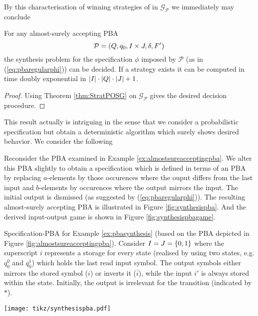 By this characterisation of winning strategies of \eve{} in 
$\mathcal{G}_{\mathcal{P}}$ we immediately may conclude
\begin{theorem}
  For any almost-surely accepting \ac{PBA} 
  \begin{equation*}
    \mathcal{P} = \left(Q, q_{0}, I\times J, \delta, F'\right)
  \end{equation*}
  the synthesis problem for the specification $\phi$ imposed by $\mathcal{P}$
  (as in (\ref{eq:pbaregularphi})) can be decided. If a strategy exists it can 
  be computed in time doubly exponential in 
  $\left\vert{I}\right\vert\cdot \left\vert{Q}\right\vert\cdot \left\vert{J}\right\vert + 1$.
  \label{thm:pbastratpomdpsynthesis}
\end{theorem}
\begin{proof}
  Using Theorem \ref{thm:StratPOSG} on $\mathcal{G}_{\mathcal{P}}$ gives the
  desired decision procedure.
\end{proof}
This result actually is intriguing in the sense that we consider a 
probabilistic specification but obtain a deterministic algorithm which surely 
shows desired behavior. We consider the following
\begin{example}
  Reconsider the \ac{PBA} examined in Example \ref{ex:almostsureacceptingpba}.
  We alter this \ac{PBA} slightly to obtain a specification which is defined in
  terms of an \ac{PBA} by replacing $a$-elements by those occurences where the
  ouput differs from the last input and $b$-elements by occurences where the 
  output mirrors the input. The initial output is dismissed (as suggested by
  (\ref{eq:pbaregularphi})). The resulting almost-surely accepting \ac{PBA} is
  illustrated in Figure \ref{fig:synthesispba}. And the derived input-output 
  game is shown in Figure \ref{fig:synthesispbagame}.
  \label{ex:pbasynthesis}
\end{example}
\begin{drawing}
  \caption{
    Specification-PBA for Example \ref{ex:pbasynthesis} (based on the PBA 
    depicted in Figure \ref{fig:almostsureacceptingpba}). Consider 
    $I = J =\left\{0,1\right\}$ where the superscript $i$ represents a storage for every
    state (realised by using two states, e.g. $q_{0}^{0}$ and $q_{0}^{1}$) 
    which holds the last read input symbol. The output symbols either mirrors 
    the stored symbol ($i$) or inverts it ($\overline{i}$), while the input 
    $i'$ is always stored within the state. Initially, the output is irrelevant 
    for the transition (indicated by $*$).
  }
  \label{fig:synthesispba}
  \begin{center}
    \texttt{[image: tikz/synthesispba.pdf]}
  \end{center}
\end{drawing}

